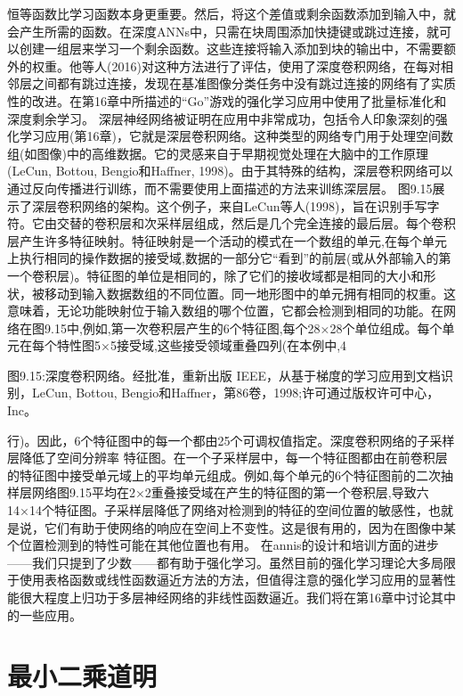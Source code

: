 {恒等函数比学习函数本身更重要。然后，将这个差值或剩余函数添加到输入中，就会产生所需的函数。在深度ANNs中，只需在块周围添加快捷键或跳过连接，就可以创建一组层来学习一个剩余函数。这些连接将输入添加到块的输出中，不需要额外的权重。他等人(2016)对这种方法进行了评估，使用了深度卷积网络，在每对相邻层之间都有跳过连接，发现在基准图像分类任务中没有跳过连接的网络有了实质性的改进。在第16章中所描述的“Go”游戏的强化学习应用中使用了批量标准化和深度剩余学习。
深层神经网络被证明在应用中非常成功，包括令人印象深刻的强化学习应用(第16章)，它就是深层卷积网络。这种类型的网络专门用于处理空间数组(如图像)中的高维数据。它的灵感来自于早期视觉处理在大脑中的工作原理(LeCun, Bottou, Bengio和Haffner, 1998)。由于其特殊的结构，深层卷积网络可以通过反向传播进行训练，而不需要使用上面描述的方法来训练深层层。
图9.15展示了深层卷积网络的架构。这个例子，来自LeCun等人(1998)，旨在识别手写字符。它由交替的卷积层和次采样层组成，然后是几个完全连接的最后层。每个卷积层产生许多特征映射。特征映射是一个活动的模式在一个数组的单元,在每个单元上执行相同的操作数据的接受域,数据的一部分它“看到”的前层(或从外部输入的第一个卷积层)。特征图的单位是相同的，除了它们的接收域都是相同的大小和形状，被移动到输入数据数组的不同位置。同一地形图中的单元拥有相同的权重。这意味着，无论功能映射位于输入数组的哪个位置，它都会检测到相同的功能。在网络在图9.15中,例如,第一次卷积层产生的6个特征图,每个28×28个单位组成。每个单元在每个特性图5×5接受域,这些接受领域重叠四列(在本例中,4
 

图9.15:深度卷积网络。经批准，重新出版
IEEE，从基于梯度的学习应用到文档识别，LeCun, Bottou, Bengio和Haffner，第86卷，1998;许可通过版权许可中心，Inc。

行)。因此，6个特征图中的每一个都由25个可调权值指定。深度卷积网络的子采样层降低了空间分辨率
特征图。在一个子采样层中，每一个特征图都由在前卷积层的特征图中接受单元域上的平均单元组成。例如,每个单元的6个特征图前的二次抽样层网络图9.15平均在2×2重叠接受域在产生的特征图的第一个卷积层,导致六14×14个特征图。子采样层降低了网络对检测到的特征的空间位置的敏感性，也就是说，它们有助于使网络的响应在空间上不变性。这是很有用的，因为在图像中某个位置检测到的特性可能在其他位置也有用。
在annis的设计和培训方面的进步——我们只提到了少数——都有助于强化学习。虽然目前的强化学习理论大多局限于使用表格函数或线性函数逼近方法的方法，但值得注意的强化学习应用的显著性能很大程度上归功于多层神经网络的非线性函数逼近。我们将在第16章中讨论其中的一些应用。


\section{最小二乘道明}

}
